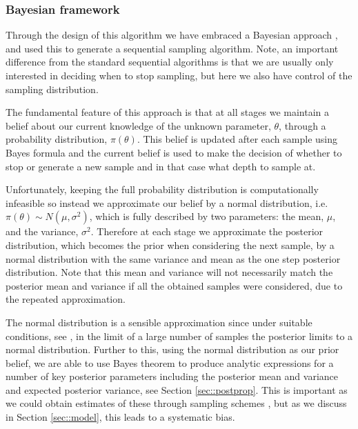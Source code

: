\subsubsection{Bayesian framework}\label{sec::bayes}
Through the design of this algorithm we have embraced a Bayesian approach \cite{}, and used this to generate a sequential sampling algorithm. Note, an important difference from the standard sequential algorithms is that we are usually only interested in deciding when to stop sampling, but here we also have control of the sampling distribution.

The fundamental feature of this approach is that at all stages we maintain a belief about our current knowledge of the unknown parameter, $\theta$, through a probability distribution, $\pi(\theta)$. This belief is updated after each sample using Bayes formula \cite{} and the current belief is used to make the decision of whether to
stop or generate a new sample and in that case what depth to sample at.

Unfortunately, keeping the full probability distribution is computationally infeasible so instead we approximate our belief by a normal distribution, i.e. $\pi(\theta) \sim N(\mu,\sigma^2)$, which is fully described by two parameters: the mean, $\mu$, and the variance, $\sigma^2$. Therefore at each stage we approximate the posterior distribution, which becomes the prior when considering the next sample, by a normal distribution with the same variance and mean as the one step posterior distribution. Note that this mean and variance will not necessarily match the posterior mean and variance if all the obtained samples were considered, due to the repeated approximation.

The normal distribution is a sensible approximation since under suitable conditions, see \cite{}, in the limit of a large number of samples the posterior limits to a normal distribution. Further to this, using the normal distribution as our prior belief, we are able to use Bayes theorem to produce analytic expressions for a number of key posterior parameters including the posterior mean and variance and expected posterior variance, see Section \ref{sec::postprop}. This is important as we could obtain estimates of these through sampling schemes \cite{}, but as we discuss in Section \ref{sec::model}, this leads to a systematic bias.

